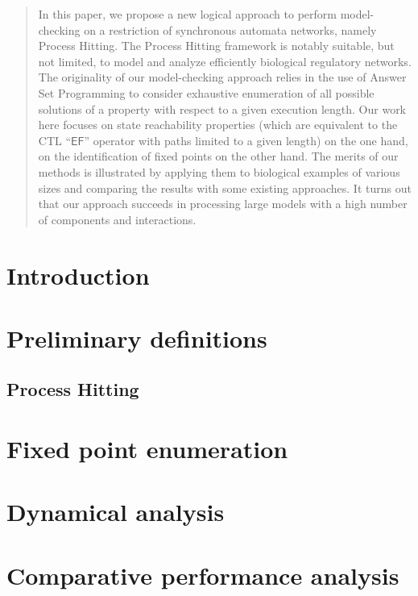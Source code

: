 \documentclass[conference]{IEEEtran}
\begin{document}
\begin{abstract}
In this paper, we propose a new logical approach to perform model-checking on a restriction of synchronous automata networks, namely Process Hitting. The Process Hitting framework is notably suitable, but not limited, to model and analyze efficiently biological regulatory networks. 
The originality of our model-checking approach relies in the use of Answer Set Programming to consider exhaustive enumeration of all possible solutions of a property with respect to a given execution length.  Our work here focuses on state reachability properties (which are equivalent to the CTL ``$\mathsf{EF}$'' operator with paths limited to a given length) on the one hand, on the identification of fixed points on the other hand.
The merits of our methods is illustrated by applying them to
biological examples of various sizes
and comparing the results with some existing approaches.
It turns out that our approach succeeds in processing large models
with a high number of components and interactions.
\end{abstract}

\IEEEpeerreviewmaketitle



\section{Introduction}


\section{Preliminary definitions}
\label{sec:defs}

\subsection{Process Hitting}


\section{Fixed point enumeration}
\label{sec:fixpoint}


\section{Dynamical analysis}
\label{sec:dynamics}


\section{Comparative performance analysis}
\label{sec:comparison}

\end{document}
